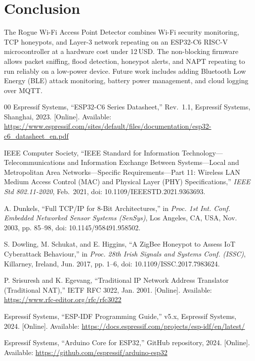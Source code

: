 \documentclass[conference]{IEEEtran}
\begin{document}
\FloatBarrier
\section{Conclusion}
The Rogue Wi-Fi Access Point Detector combines Wi-Fi security monitoring, TCP honeypots, and Layer-3 network repeating on an ESP32-C6 RISC-V microcontroller at a hardware cost under 12\,USD. The non-blocking firmware allows packet sniffing, flood detection, honeypot alerts, and NAPT repeating to run reliably on a low-power device. Future work includes adding Bluetooth Low Energy (BLE) attack monitoring, battery power management, and cloud logging over MQTT.

\FloatBarrier
\begin{thebibliography}{00}
Espressif Systems, ``ESP32-C6 Series Datasheet,'' Rev.~1.1, Espressif Systems, Shanghai, 2023. [Online]. Available: \url{https://www.espressif.com/sites/default/files/documentation/esp32-c6_datasheet_en.pdf}

IEEE Computer Society, ``IEEE Standard for Information Technology---Telecommunications and Information Exchange Between Systems---Local and Metropolitan Area Networks---Specific Requirements---Part 11: Wireless LAN Medium Access Control (MAC) and Physical Layer (PHY) Specifications,'' \textit{IEEE Std 802.11-2020}, Feb.~2021, doi: 10.1109/IEEESTD.2021.9363693.

A. Dunkels, ``Full TCP/IP for 8-Bit Architectures,'' in \textit{Proc. 1st Int. Conf. Embedded Networked Sensor Systems (SenSys)}, Los Angeles, CA, USA, Nov. 2003, pp. 85--98, doi: 10.1145/958491.958502.

S. Dowling, M. Schukat, and E. Higgins, ``A ZigBee Honeypot to Assess IoT Cyberattack Behaviour,'' in \textit{Proc. 28th Irish Signals and Systems Conf. (ISSC)}, Killarney, Ireland, Jun. 2017, pp. 1--6, doi: 10.1109/ISSC.2017.7983624.

P. Srisuresh and K. Egevang, ``Traditional IP Network Address Translator (Traditional NAT),'' IETF RFC 3022, Jan. 2001. [Online]. Available: \url{https://www.rfc-editor.org/rfc/rfc3022}

Espressif Systems, ``ESP-IDF Programming Guide,'' v5.x, Espressif Systems, 2024. [Online]. Available: \url{https://docs.espressif.com/projects/esp-idf/en/latest/}

Espressif Systems, ``Arduino Core for ESP32,'' GitHub repository, 2024. [Online]. Available: \url{https://github.com/espressif/arduino-esp32}


\end{thebibliography}
\end{document}
